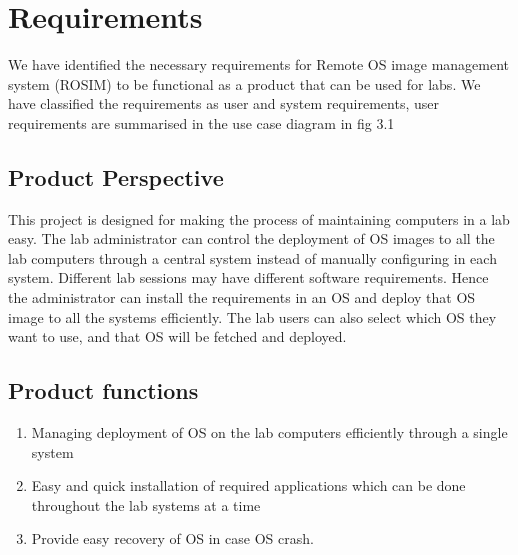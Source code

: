 \documentclass[a4paper,12pt]{article}
\begin{document}
\newpage
\section{\fontsize{16pt}{1em} Requirements}
We have identified the necessary requirements for Remote OS image management system (ROSIM) to be functional as a product that can be used for labs. We have classified the requirements as user and system requirements, user requirements are summarised in the use case diagram in fig 3.1
\subsection{Product Perspective}
This project is designed for making the process of maintaining computers in a lab easy. The lab administrator can control the deployment of OS images to all the lab computers through a central system instead of manually configuring in each system. Different lab sessions may have different software requirements. Hence the administrator can install the requirements in an OS and deploy that OS image to all the systems efficiently. The lab users can also select which OS they want to use, and that OS will be fetched and deployed.
\subsection{Product functions}
\begin{enumerate}
    \item Managing deployment of OS on the lab computers efficiently through a single system
    \item Easy and quick installation of required applications which can be done throughout the lab systems at a time
    \item Provide easy recovery of OS in case OS crash.
\end{enumerate}
\end{document}
